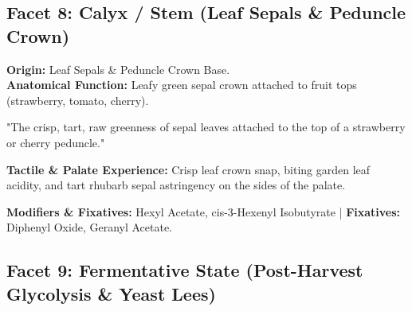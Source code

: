 \documentclass[11pt,a4paper]{article}
\begin{document}
\subsection{Facet 8: Calyx / Stem (Leaf Sepals \& Peduncle Crown)}

\begin{botanicalbox}
\textbf{Origin:} Leaf Sepals \& Peduncle Crown Base.\\
\textbf{Anatomical Function:} Leafy green sepal crown attached to fruit tops (strawberry, tomato, cherry).
\end{botanicalbox}

\begin{sensoryquote}
"The crisp, tart, raw greenness of sepal leaves attached to the top of a strawberry or cherry peduncle."
\end{sensoryquote}

\begin{flavourbox}
\textbf{Tactile \& Palate Experience:} Crisp leaf crown snap, biting garden leaf acidity, and tart rhubarb sepal astringency on the sides of the palate.
\end{flavourbox}

\begin{table}[htbp]
\centering
\caption{Primary Impact Actors for Facet 8 (Calyx / Stem)}
\vspace{0.3em}
\end{table}

\textbf{Modifiers \& Fixatives:} Hexyl Acetate, cis-3-Hexenyl Isobutyrate | \textbf{Fixatives:} Diphenyl Oxide, Geranyl Acetate.

\newpage

\subsection{Facet 9: Fermentative State (Post-Harvest Glycolysis \& Yeast Lees)}
\end{document}
